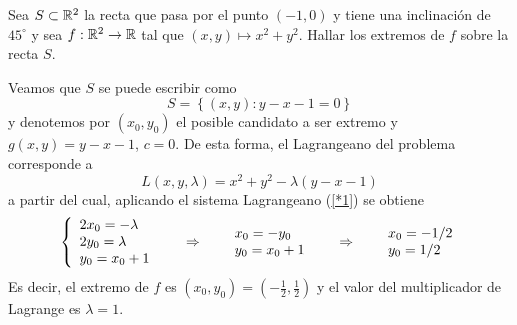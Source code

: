 \begin{ejemplo}\label{1}
Sea $S\subset\mathbb{R}^{2}$ la recta que pasa por el punto $(-1,0)$ y tiene
una inclinaci\'on de $45^{\circ}$ y sea $f:\mathbb{R}^{2}\to \mathbb{R}$ tal
que $(x,y)\mapsto x^{2}+y^{2}$. Hallar los extremos de $f$ sobre la recta
$S$.

\begin{solucion}
Veamos que $S$ se puede escribir como
\[
S=\left\{  (x,y): y-x-1=0\right\}
\]
y denotemos por $(x_{0},y_{0})$ el posible candidato a ser extremo y
$g(x,y)=y-x-1$, $c=0$. De esta forma, el Lagrangeano del problema corresponde a
$$L(x,y,\lambda)=x^2 + y^2 -\lambda (y-x-1)$$
a partir del cual, aplicando el sistema Lagrangeano (\ref{*1}) se obtiene
\[%
\begin{array}
[c]{lllll}%
\left\{
\begin{array}
[c]{l}%
2x_{0}=-\lambda\\
2y_{0}=\lambda\\
y_{0}=x_{0}+1
\end{array}
\right.   & \quad\Rightarrow\quad &
\begin{array}
[c]{l}%
x_{0}=-y_{0}\\
y_{0}=x_{0}+1
\end{array}
& \quad\Rightarrow\quad &
\begin{array}
[c]{l}%
x_{0}=-1/2\\
y_{0}=1/2
\end{array}
\end{array}
\]
Es decir, el extremo de $f$ es $(x_{0},y_{0})=(-\frac{1}{2},\frac{1}{2})$ y el
valor del multiplicador de Lagrange es $\lambda=1$.
\end{solucion}
\end{ejemplo}

